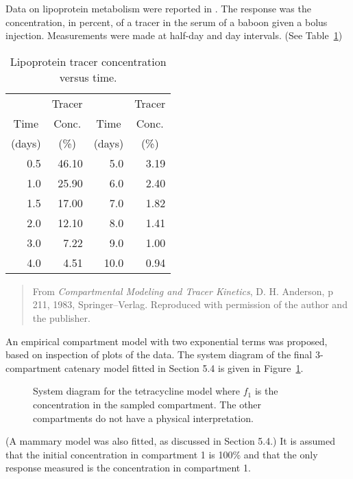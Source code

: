 Data on lipoprotein metabolism were reported in
.
The response was the concentration, in percent, of a tracer in
the serum of a baboon given a bolus injection.
Measurements were made at half-day and day intervals.
(See Table~\ref{atbl:lipo})
\begin{table}
  \caption{\label{atbl:lipo}
  Lipoprotein tracer concentration versus time.}
  \begin{center}
    \begin{tabular}{r r r r}
      \hline
      &\multicolumn{1}{c}{Tracer}&&\multicolumn{1}{c}{Tracer}\\
      \multicolumn{1}{c}{Time}&\multicolumn{1}{c}{Conc.}&
      \multicolumn{1}{c}{Time}&\multicolumn{1}{c}{Conc.}\\
      \multicolumn{1}{c}{(days)}&\multicolumn{1}{c}{(\%)}&
      \multicolumn{1}{c}{(days)}&\multicolumn{1}{c}{(\%)}\\
      \hline
      0.5&46.10&5.0&3.19 \\
      1.0&25.90&6.0&2.40 \\
      1.5&17.00&7.0&1.82 \\
      2.0&12.10&8.0&1.41 \\
      3.0&7.22&9.0&1.00 \\
      4.0&4.51&10.0&0.94\\
      \hline
    \end{tabular}
  \end{center}
\begin{quote}\small
  From {\em Compartmental Modeling and Tracer Kinetics}, D. H.
  Anderson, p 211, 1983, Springer--Verlag.  Reproduced with permission of
  the author and the publisher.
\end{quote}
\end{table}
An empirical compartment model with two exponential terms was proposed,
based on inspection of plots of the data.
The system diagram of the final 3-compartment catenary
model fitted in Section 5.4 is given in
Figure~\ref{fig:tetra}.

\begin{figure}
  \centerline{\box\graph}
  \caption{\label{fig:tetra}
  System diagram for the tetracycline model where $f_{1}$ is the
  concentration in the sampled compartment.  The other compartments do
  not have a physical interpretation.}
\end{figure}
(A mammary model was also fitted, as discussed in Section 5.4.)
It is assumed that the initial concentration in compartment 1 is 100\%
and that the only response measured is the concentration in compartment 1.

